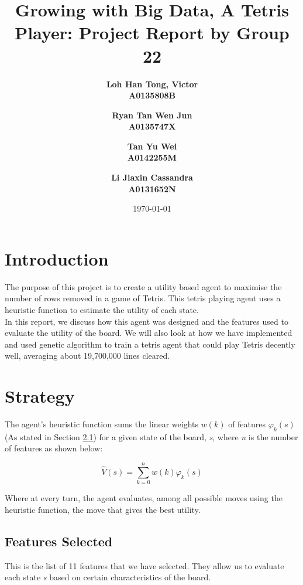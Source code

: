\documentclass[a4paper,12pt,twocolumn]{article}
\begin{document}
\setlength{\parindent}{0pt}

\title{Growing with Big Data, A Tetris Player: Project Report by Group 22 
}
\author{\bf{Loh Han Tong, Victor} \\ A0135808B
    \and \bf{Ryan Tan Wen Jun} \\ A0135747X \and \bf {Tan Yu Wei} \\ A0142255M
    \and \bf
    {Li Jiaxin Cassandra} \\ 
    A0131652N
}
\date{\today}
\maketitle

\section{Introduction}
The purpose of this project is to create a utility based agent to maximise the
number of rows removed in a game of Tetris. This tetris playing agent uses a heuristic
function to estimate the utility of each state.\\

In this report, we discuss how this agent was designed and the features used to
evaluate the utility of the board. We will also look at how we have implemented
and used genetic algorithm to train a tetris agent that could play Tetris decently well,
averaging about 19,700,000 lines cleared.

\section{Strategy}
The agent's heuristic function sums the linear weights $w(k)$ of features $\varphi_k(s)$
(As stated in Section \ref{features_subsection}) for a given state of the board,
\textit{s}, where \textit{n} is the number of features as shown below:

\[
    \hat V(s) = \sum_{k=0}^{n}w(k)\varphi_k(s)
\]

Where at every turn, the agent evaluates, among all possible moves using the
heuristic function, the move that gives the best utility.

\subsection{Features Selected}
\label{features_subsection}
This is the list of 11 features that we have selected. They allow us to
evaluate each state \textit{s} based on certain characteristics of the board.\\
\end{document}
